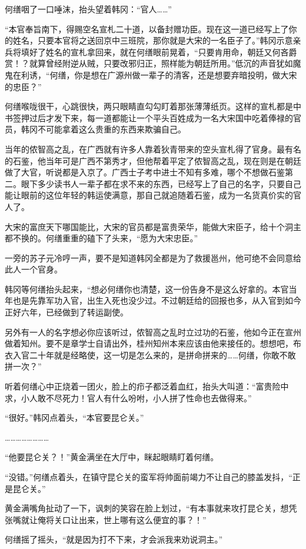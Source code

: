 何缮咽了一口唾沫，抬头望着韩冈：“官人……”

“本官奉旨南下，得赐空名宣札二十道，以备封赠功臣。现在这一道已经写上了你的姓名，只要本官将之送回京中三班院，那你就是大宋的一名臣子了。”韩冈示意亲兵将填好了姓名的宣札拿回来，就在何缮眼前晃着，“只要肯用命，朝廷又何吝爵赏！？就算曾经附逆从贼，只要改邪归正，照样能为朝廷所用。”低沉的声音犹如魔鬼在利诱，“何缮，你是想在广源州做一辈子的清客，还是想要弃暗投明，做大宋的忠臣？”

何缮喉咙很干，心跳很快，两只眼睛直勾勾盯着那张薄薄纸页。这样的宣札都是中书签押过后才发下来，每一道都能让一个平头百姓成为一名大宋国中吃着俸禄的官员，韩冈不可能拿着这么贵重的东西来欺骗自己。

当年的侬智高之乱，在广西就有许多人靠着狄青带来的空头宣札得了官身。最有名的石鉴，他当年可是广西不第秀才，但他帮着平定了侬智高之乱，现在则是在朝廷做了大官，听说都是入京了。广西士子考中进士不知有多难，哪个不想做石鉴第二。眼下多少读书人一辈子都在求不来的东西，已经写上了自己的名字，只要自己能让眼前的这位年轻的韩运使满意，那自己就追随着石鉴，成为一名货真价实的官人了。

大宋的富庶天下哪国能比，大宋的官员都是富贵荣华，能做大宋臣子，给十个洞主都不换的。何缮重重的磕下了头来，“愿为大宋忠臣。”

一旁的苏子元冷哼一声，要不是知道韩冈全都是为了救援邕州，他可绝不会同意给此人一个官身。

韩冈等何缮抬头起来，“想必何缮你也清楚，这一份告身不是这么好拿的。本官当年也是先靠军功入官，出生入死也没少过。不过朝廷给的回报也多，从入官到如今正好六年，已经做到了转运副使。

另外有一人的名字想必你应该听过，侬智高之乱时立过功的石鉴，他如今正在宣州做着知州。要不是章学士自请出外，桂州知州本来应该由他来接任的。想想吧，布衣入官二十年就是经略使，这一切是怎么来的，是拼命拼来的……何缮，你敢不敢拼一次？”

听着何缮心中正烧着一团火，脸上的疖子都泛着血红，抬头大叫道：“富贵险中求，小人敢不尽死力！官人有什么吩咐，小人拼了性命也去做得来。”

“很好。”韩冈点着头，“本官要昆仑关。”

……………………

“他要昆仑关？！”黄金满坐在大厅中，眯起眼睛盯着何缮。

“没错。”何缮点着头，在镇守昆仑关的蛮军将帅面前竭力不让自己的膝盖发抖，“正是昆仑关。”

黄金满嘴角扯动了一下，讽刺的笑容在脸上划过，“有本事就来攻打昆仑关，想凭张嘴就让俺将关口让出来，世上哪有这么便宜的事？！”

何缮摇了摇头，“就是因为打不下来，才会派我来劝说洞主。”

